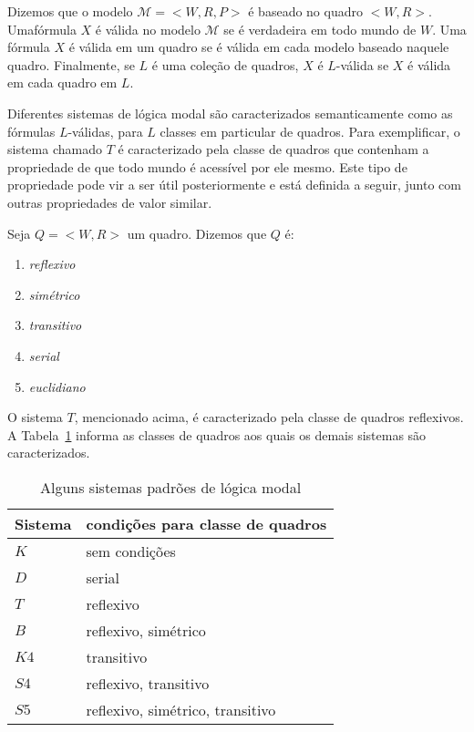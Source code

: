 \begin{definition}[$L$-Válida]
    Dizemos que o modelo $\mathcal{M} = <W, R, P>$ é baseado no quadro $<W,R>$.
    Umafórmula $X$ é válida no modelo $\mathcal{M}$ se é verdadeira em todo
    mundo de $W$. Uma fórmula $X$ é válida em um quadro se é válida em cada
    modelo baseado naquele quadro. Finalmente, se $L$ é uma coleção de quadros,
    $X$ é $L$-válida se $X$ é válida em cada quadro em $L$.
\end{definition}

Diferentes sistemas de lógica modal são caracterizados semanticamente como as
fórmulas $L$-válidas, para $L$ classes em particular de quadros. Para
exemplificar, o sistema chamado $T$ é caracterizado pela classe de quadros que
contenham a propriedade de que todo mundo é acessível por ele mesmo. Este tipo
de propriedade pode vir a ser útil posteriormente e está definida a seguir,
junto com outras propriedades de valor similar.

\begin{definition}
    Seja $Q = <W,R>$ um quadro. Dizemos que $Q$ é:
    \begin{enumerate}
        \item \textit{reflexivo}
        \item \textit{simétrico}
        \item \textit{transitivo}
        \item \textit{serial}
        \item \textit{euclidiano}
    \end{enumerate}
    
\end{definition}

O sistema $T$, mencionado acima, é caracterizado pela classe de quadros
reflexivos. A Tabela~\ref{table:condicoes_quadro} informa as classes de quadros
aos quais os demais sistemas são caracterizados.

\begin{table}
    \begin{center}
        \label{table:condicoes_quadro}
        \caption{Alguns sistemas padrões de lógica modal}
        \begin{tabular}{ll}
            \hline
            Sistema & condições para classe de quadros \\
            \hline
            $K$  & sem condições \\  
            $D$  & serial \\ 
            $T$  & reflexivo \\ 
            $B$  & reflexivo, simétrico\\ 
            $K4$ & transitivo \\  
            $S4$ & reflexivo, transitivo \\  
            $S5$ & reflexivo, simétrico, transitivo \\
            \hline
        \end{tabular}
    \end{center}
\end{table}

